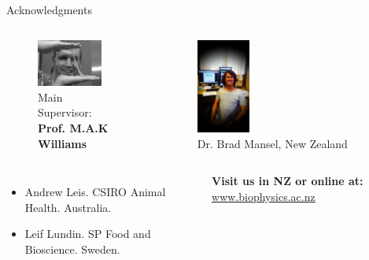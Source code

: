 \documentclass[9pt]{beamer}
\begin{document}
\begin{frame}{Acknowledgments}
\begin{columns}[onlytextwidth]
  \end{columns}
  \begin{columns}[onlytextwidth]
\begin{figure}[htpb]
  \centering
  \includegraphics[width=0.8\textwidth]{./Figures/people/bill.png}
  \caption*{Main Supervisor: \textbf{Prof. M.A.K Williams}}
\end{figure}
    \begin{figure}[htpb]
      \centering
      \includegraphics[width=0.3\textwidth]{./Figures/people/brad.png}
      \caption*{Dr. Brad Mansel, New Zealand}
    \end{figure}
  \end{columns}
  \begin{columns}[onlytextwidth]
    \begin{itemize}
      \item Andrew Leis. CSIRO Animal Health. Australia.
      \item Leif Lundin. SP Food and Bioscience. Sweden.
    \end{itemize}
    \textbf{Visit us in NZ or online at:}\newline
        \url{www.biophysics.ac.nz}
  \end{columns}
\end{frame}
\end{document}
